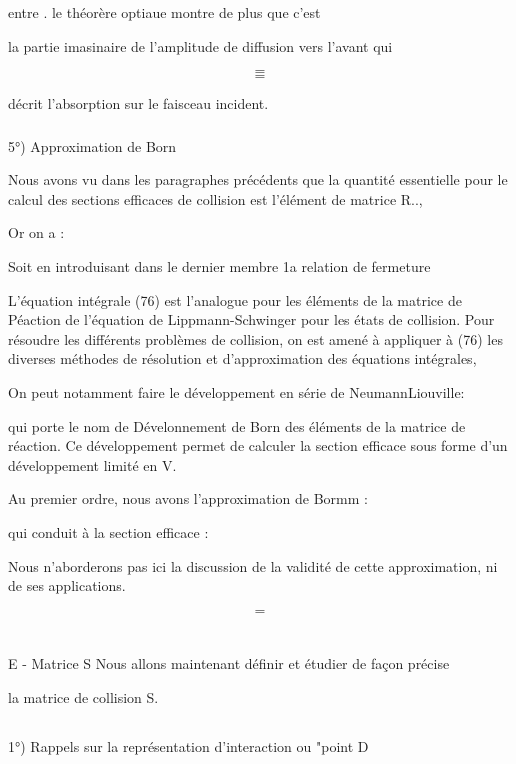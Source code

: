entre . le théorère optiaue montre de plus que c'est

la partie imasinaire de l'amplitude de diffusion vers l'avant  qui

\[
\tag{71}=
\]
\[
\tag{78}=
\]


décrit l'absorption sur le faisceau incident.

\subsubsection{}%
5°) Approximation de Born

Nous avons vu dans les paragraphes précédents que la quantité
essentielle pour le calcul des sections efficaces de collision est l'élément de
matrice R..,

Or on a :

Soit en introduisant dans le dernier membre 1a relation de fermeture

L'équation intégrale (76) est l'analogue pour les éléments de la matrice
de Péaction de l'équation de Lippmann-Schwinger pour les états de collision.
Pour résoudre les différents problèmes de collision, on est amené à appliquer à
(76) les diverses méthodes de résolution et d'approximation des
équations intégrales,

On peut notamment faire le développement en série de NeumannLiouville:

qui porte le nom de Dévelonnement de Born des éléments de la matrice de
réaction. Ce développement permet de calculer la section efficace sous
forme d'un développement limité en V.

Au premier ordre, nous avons l'approximation de Bormm : 

qui conduit à la section efficace :

Nous n'aborderons pas ici la discussion de la validité de cette approximation,
ni de ses applications.

\[
\tag{80}=
\]


\section{}%
E - Matrice S
Nous allons maintenant définir et étudier de façon précise

la matrice de collision S.

\subsection{}%
1°) Rappels sur la représentation d'interaction ou "point
D

